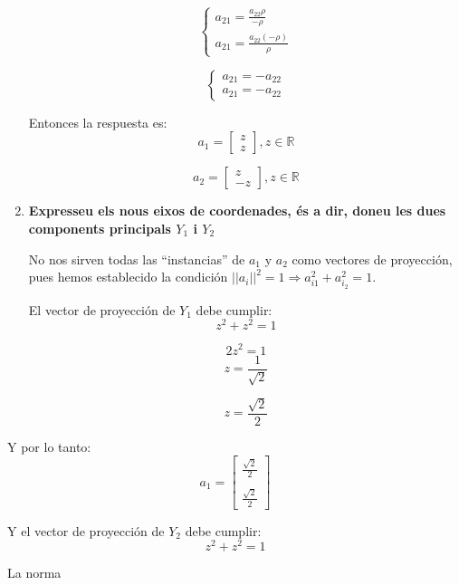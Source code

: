 \documentclass[a4paper,10pt]{article}
\begin{document}
\begin{enumerate}
  \begin{equation*}
    \begin{cases}
      a_{21} = \frac{a_{22}\rho}{-\rho} \\
      a_{21} = \frac{a_{22}(-\rho)}{\rho}
    \end{cases}
  \end{equation*}

  \begin{equation*}
    \begin{cases}
      a_{21} = -a_{22} \\
      a_{21} = -a_{22}
    \end{cases}
  \end{equation*}

  Entonces la respuesta es:
  \begin{equation*}
    a_1 =
    \begin{bmatrix}
      z \\ z
    \end{bmatrix}
    , z \in \mathbb{R}
  \end{equation*}

  \begin{equation*}
    a_2 =
    \begin{bmatrix}
      z \\ -z
    \end{bmatrix}
    , z \in \mathbb{R}
  \end{equation*}

  \item \textbf{Expresseu els nous eixos de coordenades, és a dir, doneu les dues components principals $Y_1$ i $Y_2$}

  No nos sirven todas las ``instancias'' de $a_1$ y $a_2$ como vectores de proyección, pues hemos establecido la condición $||a_i||^2 = 1 \Rightarrow a_{i1}^2 + a_{i_2}^2 = 1$.

  El vector de proyección de $Y_1$ debe cumplir:
  \begin{equation*}
    z^2 + z^2 = 1
  \end{equation*}

  \begin{equation*}
    2z^2 = 1
  \end{equation*}
  \begin{equation*}
    z = \frac{1}{\sqrt{2}}
  \end{equation*}

  \begin{equation*}
    z = \frac{\sqrt{2}}{2}
  \end{equation*}
\end{enumerate}

Y por lo tanto:
\begin{equation*}
  a_1 =
  \begin{bmatrix}
    \frac{\sqrt{2}}{2} \\ \\
    \frac{\sqrt{2}}{2}
  \end{bmatrix}
\end{equation*}

Y el vector de proyección de $Y_2$ debe cumplir:
\begin{equation*}
  z^2 + z^2 = 1
\end{equation*}

La norma
\end{document}
